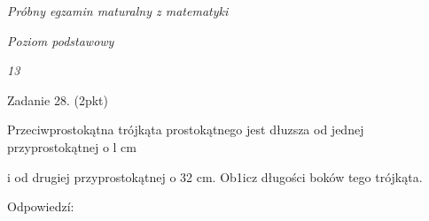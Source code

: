 \documentclass[a4paper,12pt]{article}
\begin{document}
{\it Próbny egzamin maturalny z matematyki}

{\it Poziom podstawowy}

{\it 13}

Zadanie 28. (2pkt)

Przeciwprostokątna trójkąta prostokątnego jest dłuzsza od jednej przyprostokątnej o l cm

i od drugiej przyprostokątnej o 32 cm. Ob1icz długości boków tego trójkąta.

Odpowiedzí:
\end{document}
